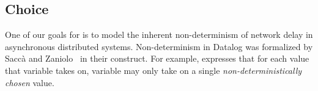 
\subsection{Choice}


One of our goals for \lang is to model the inherent non-determinism of network
delay in asynchronous distributed systems.  Non-determinism in Datalog was
formalized by Sacc\`{a} and Zaniolo~\cite{sacca-zaniolo} in their
 construct.  
For example,
 expresses that for each value
that variable  takes on, variable  may only take on a
single {\em non-deterministically chosen} value. 

